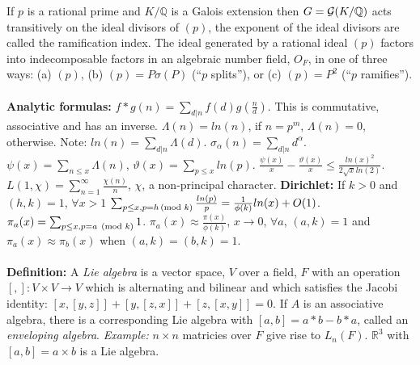 If $p$ is a rational prime and $K/ {\mathbb Q}$ is a Galois extension 
then $G= {\cal G}(K/{\mathbb Q})$ acts transitively on the ideal divisors of $(p)$,
the exponent of the ideal divisors are called the ramification index.  The ideal generated
by a rational ideal $(p)$ factors into indecomposable factors
in an algebraic number field, $O_F$, in one of
three ways: (a) $(p)$, (b) $(p)= P \sigma(P)$ (``$p$ splits''), or (c)
$(p)= P^2$ (``$p$ ramifies'').
\\
\\
{\bf Analytic formulas:} $f*g(n)= \sum_{d|n} f(d)g({\frac n d})$.  
This is commutative, associative and has an inverse.
$\Lambda(n)= ln(n)$, if $n= p^m$,
$\Lambda(n)= 0$, otherwise.  Note: $ln(n)= \sum_{d|n} \Lambda(d)$.
$\sigma_{\alpha}(n)= \sum_{d|n} d^{\alpha}$.
$\psi(x)= \sum_{n \leq x} \Lambda(n)$,
$\vartheta(x)= \sum_{p \leq x} ln(p)$.
${\frac {\psi(x)} {x}} -
{\frac {\vartheta(x)} {x}} \leq {\frac {ln(x)^2} {2 {\sqrt x} ln(2)}}$.
$L(1,\chi)= \sum_{n=1}^{\infty} {\frac {\chi(n)} n}$, $\chi$, a
non-principal character.
{\bf Dirichlet:}  If $k>0$ and $(h,k)=1$, $\forall x>1$
$\sum_{p \leq x, p=h \thinspace \textnormal{(mod } k \textnormal{)}} {\frac {ln(p)} p}=
{\frac 1 {\phi(k)}} ln(x) + O(1)$.
$\pi_a (x)= \sum_{p \leq x, p=a \; \thinspace \textnormal{(mod } k \textnormal{)}} 1$.
$\pi_a (x) \approx {\frac {\pi(x)} {\phi(k)}}$, $x \rightarrow 0$,
$\forall a$, $(a, k)=1$ and $\pi_a (x) \approx \pi_b (x)$ when
$(a,k)=(b,k)=1$.
\\
\\
{\bf Definition:} A \emph{Lie algebra} is a vector space, $V$ over a field, $F$ with an operation
$[,]: V \times V \rightarrow V$ which is alternating and bilinear and which satisfies the Jacobi
identity: $[x,[y,z]] + [y,[z,x]] + [z, [x,y]]= 0$.  If $A$ is an associative algebra, there is
a corresponding Lie algebra with $[a,b]= a*b-b*a$, called an \emph{enveloping algebra}.
\emph{Example:} $n \times n$ matricies over $F$ give rise to $L_n(F)$.  ${\mathbb R}^3$ with
$[a, b]= a \times b$ is a Lie algebra.

